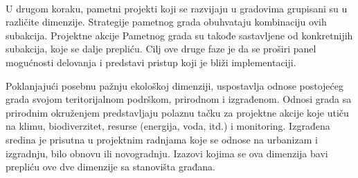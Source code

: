 \documentclass[a4paper,12pt]{article}
\begin{document}
{\begin{table}[h!]
    \centering
    \caption{Akcije projekata pametnih gradova.}
\end{table}
\\

U drugom koraku, pametni projekti koji se razvijaju u gradovima grupisani su u različite dimenzije. Strategije pametnog grada obuhvataju kombinaciju ovih subakcija. Projektne akcije Pametnog grada su takođe sastavljene od konkretnijih subakcija, koje se dalje prepliću. Cilj ove druge faze je da se proširi panel mogućnosti delovanja i predstavi pristup koji je bliži implementaciji.

Poklanjajući posebnu pažnju ekološkoj dimenziji, uspostavlja odnose postojećeg grada svojom teritorijalnom podrškom, prirodnom i izgrađenom. Odnosi grada sa prirodnim okruženjem predstavljaju polaznu tačku za projektne akcije koje utiču na klimu, biodiverzitet, resurse (energija, voda, itd.) i monitoring. Izgrađena sredina je prisutna u projektnim radnjama koje se odnose na urbanizam i izgradnju, bilo obnovu ili novogradnju. Izazovi kojima se ova dimenzija bavi prepliću ove dve dimenzije sa stanovišta građana.

}
\end{document}
